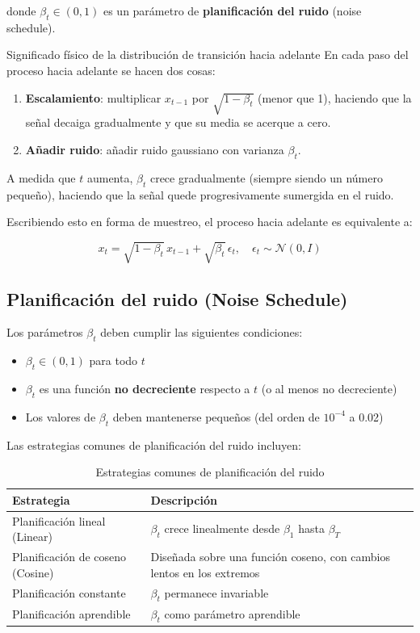 donde $\beta_t \in (0, 1)$ es un parámetro de \textbf{planificación del ruido} (noise schedule).

\begin{importantbox}{Significado físico de la distribución de transición hacia adelante}
En cada paso del proceso hacia adelante se hacen dos cosas:
\begin{enumerate}
    \item \textbf{Escalamiento}: multiplicar $x_{t-1}$ por $\sqrt{1-\beta_t}$ (menor que 1), haciendo que la señal decaiga gradualmente y que su media se acerque a cero.
    \item \textbf{Añadir ruido}: añadir ruido gaussiano con varianza $\beta_t$.
\end{enumerate}
A medida que $t$ aumenta, $\beta_t$ crece gradualmente (siempre siendo un número pequeño), haciendo que la señal quede progresivamente sumergida en el ruido.
\end{importantbox}

Escribiendo esto en forma de muestreo, el proceso hacia adelante es equivalente a:

$$x_t = \sqrt{1 - \beta_t} \, x_{t-1} + \sqrt{\beta_t} \, \epsilon_t, \quad \epsilon_t \sim \mathcal{N}(0, I)$$

\subsection{Planificación del ruido (Noise Schedule)}

Los parámetros $\beta_t$ deben cumplir las siguientes condiciones:

\begin{itemize}
    \item $\beta_t \in (0, 1)$ para todo $t$
    \item $\beta_t$ es una función \textbf{no decreciente} respecto a $t$ (o al menos no decreciente)
    \item Los valores de $\beta_t$ deben mantenerse pequeños (del orden de $10^{-4}$ a 0.02)
\end{itemize}

Las estrategias comunes de planificación del ruido incluyen:

\begin{table}[H]
\centering
\begin{tabular}{ll}
\toprule
\textbf{Estrategia} & \textbf{Descripción} \\
\midrule
Planificación lineal (Linear) & $\beta_t$ crece linealmente desde $\beta_1$ hasta $\beta_T$ \\
Planificación de coseno (Cosine) & Diseñada sobre una función coseno, con cambios lentos en los extremos \\
Planificación constante & $\beta_t$ permanece invariable \\
Planificación aprendible & $\beta_t$ como parámetro aprendible \\
\bottomrule
\end{tabular}
\caption{Estrategias comunes de planificación del ruido}
\end{table}

